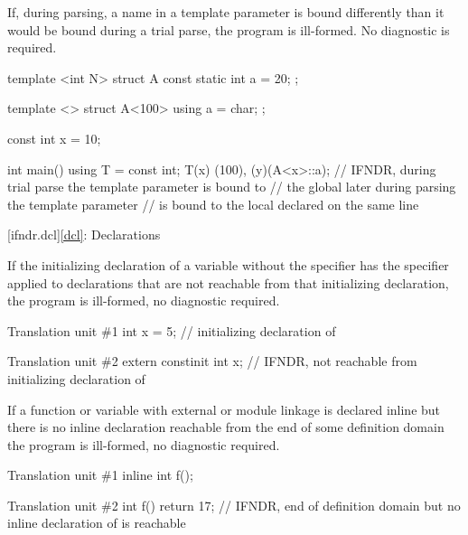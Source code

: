 \pnum
If, during
parsing, a name in a template parameter is bound differently than it would be bound during a trial parse,
the program is ill-formed. No diagnostic is required.

\pnum
\begin{example}
\begin{codeblock}
template <int N> struct A { const static int a = 20; };

template <> struct A<100> { using a = char; };

const int x = 10;

int main() {
  using T = const int;
  T(x)
  (100), (y)(A<x>::a);  // IFNDR, during trial parse the template parameter  is bound to
                        // the global  later during parsing the template parameter 
                        // is bound to the local  declared on the same line
}
\end{codeblock}
\end{example}

[ifndr.dcl]{\ref*{dcl}: Declarations}


\pnum
If the initializing declaration
of a variable without the  specifier
has the  specifier
applied to declarations that are not reachable from
that initializing declaration,
the program is ill-formed, no diagnostic required.

\pnum
\begin{example}
\begin{codeblocktu}{Translation unit \#1}
int x = 5;  // initializing declaration of 
\end{codeblocktu}
\begin{codeblocktu}{Translation unit \#2}
extern constinit int x;     // IFNDR, not reachable from initializing declaration of 
\end{codeblocktu}
\end{example}


\pnum
If a function or variable
with external or module linkage
is declared inline
but there is no inline declaration
reachable from the end of some definition domain
the program is ill-formed, no diagnostic required.

\pnum
\begin{example}
\begin{codeblocktu}{Translation unit \#1}
inline int f();
\end{codeblocktu}
\begin{codeblocktu}{Translation unit \#2}
int f() { return 17; }
    // IFNDR, end of definition domain but no inline declaration of  is reachable
\end{codeblocktu}
\end{example}

